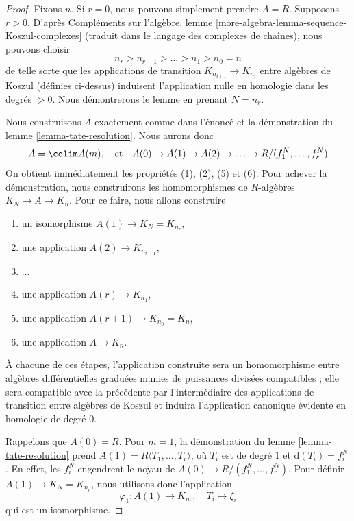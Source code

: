 \begin{proof}
Fixons $n$. Si $r = 0$, nous pouvons simplement prendre $A = R$. Supposons $r > 0$. D'après Compléments sur l'algèbre, lemme \ref{more-algebra-lemma-sequence-Koszul-complexes} (traduit dans le langage des complexes de chaînes), nous pouvons choisir
$$
n_{r} > n_{r - 1} > \ldots > n_1 > n_0 = n
$$
de telle sorte que les applications de transition $K_{n_{i + 1}} \to K_{n_i}$ entre algèbres de Koszul (définies ci-dessus) induisent l'application nulle en homologie dans les degrés $> 0$. Nous démontrerons le lemme en prenant $N = n_r$.

\medskip\noindent

Nous construisons $A$ exactement comme dans l'énoncé et la démonstration du lemme \ref{lemma-tate-resolution}. Nous aurons donc
$$
A = \colim A(m),\quad\text{et}\quad
A(0) \to A(1) \to A(2) \to \ldots \to R/(f_1^N, \ldots, f_r^N)
$$
On obtient immédiatement les propriétés (1), (2), (5) et (6). Pour achever la démonstration, nous construirons les homomorphismes de $R$-algèbres
$K_N \to A \to K_n$. Pour ce faire, nous allons construire

\begin{enumerate}

\item un isomorphisme $A(1) \to K_N = K_{n_r}$,
\item une application $A(2) \to K_{n_{r - 1}}$,
\item  $\ldots$

\item une application $A(r) \to K_{n_1}$,
\item une application $A(r + 1) \to K_{n_0} = K_n$,
\item une application $A \to K_n$.

\end{enumerate}

À chacune de ces étapes, l'application construite sera un homomorphisme entre algèbres différentielles graduées munies de puissances divisées compatibles ; elle sera compatible avec la précédente par l'intermédiaire des applications de transition entre algèbres de Koszul et induira l'application canonique évidente en homologie de degré $0$.

\medskip\noindent
Rappelons que $A(0) = R$. Pour $m = 1$, la démonstration du lemme \ref{lemma-tate-resolution} prend $A(1) = R\langle T_1, \ldots, T_r\rangle$, où $T_i$ est de degré $1$ et $\text{d}(T_i) = f_i^N$. En effet, les $f_i^N$ engendrent le noyau de $A(0) \to R/(f_1^N, \ldots, f_r^N)$. Pour définir $A(1) \to K_N = K_{n_r}$, nous utilisons donc l'application
$$
\varphi_1 : A(1) \longrightarrow K_{n_r},\quad T_i \longmapsto \xi_i
$$
qui est un isomorphisme.


\end{proof}

